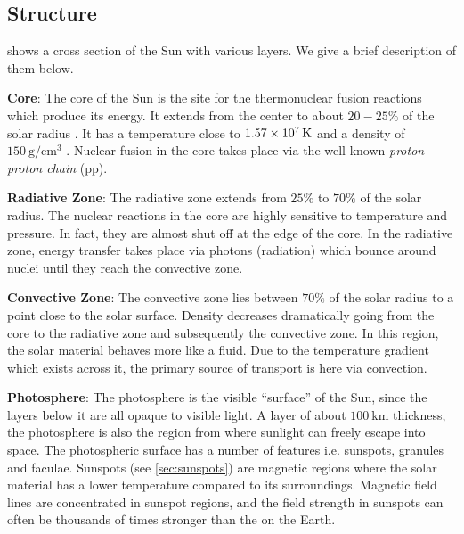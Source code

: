 \subsection{Structure}

 shows a cross section of the Sun with various layers. We give a brief 
description of them below.

\textbf{Core}: The core of the Sun is the site for the thermonuclear fusion reactions which produce 
its energy. It extends from the center to about $20-25\%$ of the solar radius \citep{SolarAct}. It 
has a temperature close to $\SI{1.57d7}{\kelvin}$ and a density of 
$\SI{150}{\gram\per\centi\metre^3}$ \citep{SolarCore}. Nuclear fusion in the core takes place via 
the well known \emph{proton-proton chain} (pp).

\textbf{Radiative Zone}: The radiative zone extends from $25\%$ to $70\%$ of the solar radius. 
The nuclear reactions in the core are highly sensitive to temperature and pressure. In fact, they 
are almost shut off at the edge of the core. In the radiative zone, energy transfer takes place via 
photons (radiation) which bounce around nuclei until they reach the convective zone.

\textbf{Convective Zone}: The convective zone lies between $70\%$ of the solar radius to a point 
close to the solar surface. Density decreases dramatically going from the core to the radiative 
zone and subsequently the convective zone. In this region, the solar material behaves more like a 
fluid. Due to the temperature gradient which exists across it, the primary source of transport is 
here via convection.

\textbf{Photosphere}: The photosphere is the visible \enquote{surface} of the Sun, since the layers 
below it are all opaque to visible light. A layer of about $\SI{100}{\kilo\metre}$ thickness, the 
photosphere is also the region from where sunlight can freely escape into space. The photospheric 
surface has a number of features i.e. sunspots, granules and faculae. Sunspots 
(see \cref{sec:sunspots}) are magnetic regions where the solar material has a lower temperature 
compared to its surroundings. Magnetic field lines are concentrated in sunspot regions, and the 
field strength in sunspots can often be thousands of times stronger than the on the Earth.


